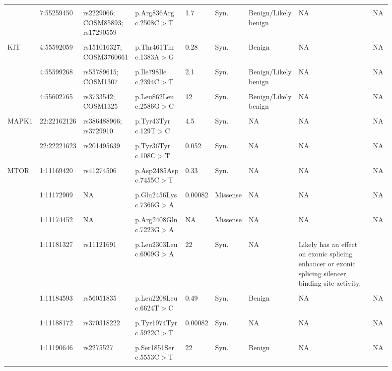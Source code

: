 \begin{landscape}
\begin{longtable}{p{0.07\linewidth}|p{0.09\linewidth}p{0.11\linewidth}p{0.1\linewidth}p{0.05\linewidth}p{0.065\linewidth}p{0.11\linewidth}p{0.25\linewidth}p{0.05\linewidth}}
		\\
		\\
		& 7:55259450 & rs2229066; COSM85893; rs17290559 & p.Arg836Arg c.2508C$>$T & 1.7 & Syn. & Benign/Likely benign & NA & NA
		\\
		\\
    \hline
		KIT & 4:55592059 & rs151016327; COSM3760661 & p.Thr461Thr c.1383A$>$G & 0.28 & Syn. & Benign & NA & NA
		\\
		\\
		& 4:55599268 & rs55789615; COSM1307 & p.Ile798Ile c.2394C$>$T & 2.1 & Syn. & Benign/Likely benign & NA & NA
		\\
		\\
		& 4:55602765 & rs3733542; COSM1325 & p.Leu862Leu c.2586G$>$C & 12 & Syn. & Benign/Likely benign & NA & NA
		\\
		\\
		\hline
		MAPK1 & 22:22162126 & rs386488966; rs3729910 & p.Tyr43Tyr c.129T$>$C & 4.5 & Syn. & NA & NA & NA
		\\
		\\
		& 22:22221623 & rs201495639 & p.Tyr36Tyr c.108C$>$T & 0.052 & Syn. & NA & NA & NA
		\\
		\\
		\hline
		MTOR & 1:11169420 & rs41274506 & p.Asp2485Asp c.7455C$>$T & 0.33 & Syn. & NA & NA & NA
		\\
		\\
		& 1:11172909 & NA & p.Glu2456Lys c.7366G$>$A & 0.00082 & Missense & NA & NA & NA
		\\
		\\
		& 1:11174452 & NA & p.Arg2408Gln c.7223G$>$A & NA & Missense & NA & NA & NA
		\\
		\\
		& 1:11181327 & rs11121691 & p.Leu2303Leu c.6909G$>$A & 22 & Syn. & NA & Likely has an effect on exonic splicing enhancer or exonic splicing silencer binding site activity. & \cite{Zining2016}
		\\
		\\
		& 1:11184593 & rs56051835 & p.Leu2208Leu c.6624T$>$C & 0.49 & Syn. & Benign & NA & NA
		\\
		\\
		& 1:11188172 & rs370318222 & p.Tyr1974Tyr c.5922C$>$T & 0.00082 & Syn. & NA & NA & NA
		\\
		\\
		& 1:11190646 & rs2275527 & p.Ser1851Ser c.5553C$>$T & 22 & Syn. & Benign & NA & NA
		\\
		\\

\end{longtable}
\end{landscape}
